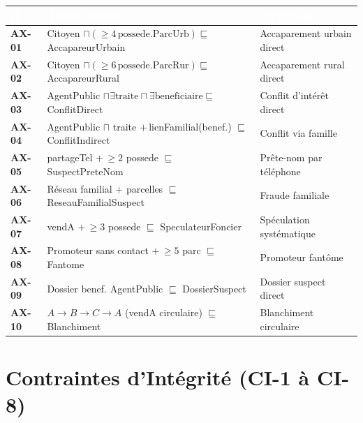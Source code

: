 \documentclass[11pt,a4paper]{report}
\begin{document}
\begin{longtable}{>{\bfseries}p{1.3cm} p{7.2cm} p{6cm}}
\toprule
\rowcolor{tablehead}\textcolor{white}{ID} & \textcolor{white}{Axiome formel} & \textcolor{white}{Sémantique} \\
\midrule
\endhead
AX-01 & Citoyen $\sqcap (\geq 4\,\text{possede.ParcUrb}) \sqsubseteq$ AccapareurUrbain & Accaparement urbain direct \\
AX-02 & Citoyen $\sqcap (\geq 6\,\text{possede.ParcRur}) \sqsubseteq$ AccapareurRural & Accaparement rural direct \\
AX-03 & AgentPublic $\sqcap \exists\text{traite} \sqcap \exists\text{beneficiaire} \sqsubseteq$ ConflitDirect & Conflit d'intérêt direct \\
AX-04 & AgentPublic $\sqcap$ traite $+\,$lienFamilial(benef.) $\sqsubseteq$ ConflitIndirect & Conflit via famille \\
AX-05 & partageTel $+\, \geq 2$ possede $\sqsubseteq$ SuspectPreteNom & Prête-nom par téléphone \\
AX-06 & Réseau familial $+$ parcelles $\sqsubseteq$ ReseauFamilialSuspect & Fraude familiale \\
AX-07 & vendA $+\, \geq 3$ possede $\sqsubseteq$ SpeculateurFoncier & Spéculation systématique \\
AX-08 & Promoteur sans contact $+\, \geq 5$ parc $\sqsubseteq$ Fantome & Promoteur fantôme \\
AX-09 & Dossier benef. AgentPublic $\sqsubseteq$ DossierSuspect & Dossier suspect direct \\
AX-10 & $A\!\to\! B\!\to\! C\!\to\! A$ (vendA circulaire) $\sqsubseteq$ Blanchiment & Blanchiment circulaire \\
\bottomrule
\end{longtable}

\section{Contraintes d'Intégrité (CI-1 à CI-8)}
\end{document}
